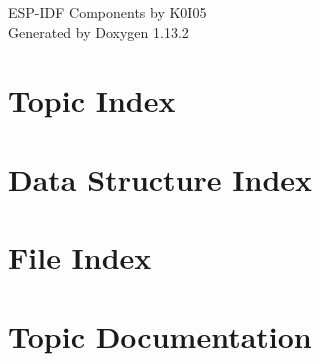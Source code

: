 \documentclass[twoside]{book}
\newcommand{\+}{\discretionary{\mbox{\scriptsize$\hookleftarrow$}}{}{}}
\newcommand{\clearemptydoublepage}{%
    \newpage{\pagestyle{empty}\cleardoublepage}%
  }
\begin{document}
  \raggedbottom
    \hypersetup{pageanchor=false,
                bookmarksnumbered=true,
                pdfencoding=unicode
               }
  \begin{titlepage}
  \vspace*{7cm}
  \begin{center}%
  {\Large ESP-\/\+IDF Components by K0\+I05}\\
  \vspace*{1cm}
  {\large Generated by Doxygen 1.13.2}\\
  \end{center}
  \end{titlepage}
  \clearemptydoublepage
  \tableofcontents
  \clearemptydoublepage
  \hypersetup{pageanchor=true}

\chapter{Topic Index}

\chapter{Data Structure Index}

\chapter{File Index}

\chapter{Topic Documentation}





\end{document}
